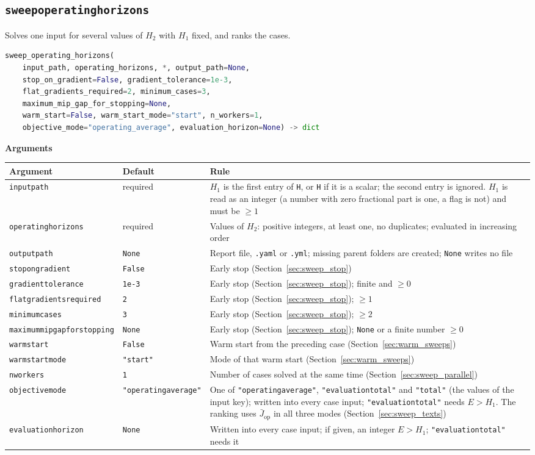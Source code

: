 \documentclass[11pt,a4paper]{article}
\makeatletter
\theoremstyle{plain}
\theoremstyle{definition}
\newcommand{\blockhead}[1]{\par\noindent\textbf{#1}\par\nobreak}
\renewcommand{\_}{\textunderscore\allowbreak{}}
\providecommand{\typerow}[3]{{\raggedright #1\par} & {\raggedright #2\par} & {\raggedright #3\par} \\}
\providecommand{\tabstart}[2]{\begingroup\small\begin{longtable}{@{}#1@{}}\toprule #2 \\ \midrule \endhead}
\providecommand{\tabend}{\bottomrule\end{longtable}\endgroup}
\makeatother
\begin{document}
\subsection{\texttt{sweep\_operating\_horizons}}
\label{sec:sweep_operating}

Solves one input for several values of $H_2$ with $H_1$ fixed, and ranks the cases.

\begin{lstlisting}[language=Python]
sweep_operating_horizons(
    input_path, operating_horizons, *, output_path=None,
    stop_on_gradient=False, gradient_tolerance=1e-3,
    flat_gradients_required=2, minimum_cases=3,
    maximum_mip_gap_for_stopping=None,
    warm_start=False, warm_start_mode="start", n_workers=1,
    objective_mode="operating_average", evaluation_horizon=None) -> dict
\end{lstlisting}

\blockhead{Arguments}
\tabstart{p{4.3cm}p{2.3cm}p{8.2cm}}{Argument & Default & Rule}
\typerow{\texttt{input\_path}}{required}{$H_1$ is the first entry of \texttt{H}, or \texttt{H} if it is a scalar; the second entry is ignored. $H_1$ is read as an integer (a number with zero fractional part is one, a flag is not) and must be $\ge 1$}
\typerow{\texttt{operating\_horizons}}{required}{Values of $H_2$: positive integers, at least one, no duplicates; evaluated in increasing order}
\typerow{\texttt{output\_path}}{\texttt{None}}{Report file, \texttt{.yaml} or \texttt{.yml}; missing parent folders are created; \texttt{None} writes no file}
\typerow{\texttt{stop\_on\_gradient}}{\texttt{False}}{Early stop (Section~\ref{sec:sweep_stop})}
\typerow{\texttt{gradient\_tolerance}}{\texttt{1e-3}}{Early stop (Section~\ref{sec:sweep_stop}); finite and $\ge 0$}
\typerow{\texttt{flat\_gradients\_required}}{\texttt{2}}{Early stop (Section~\ref{sec:sweep_stop}); $\ge 1$}
\typerow{\texttt{minimum\_cases}}{\texttt{3}}{Early stop (Section~\ref{sec:sweep_stop}); $\ge 2$}
\typerow{\texttt{maximum\_mip\_gap\_for\_stopping}}{\texttt{None}}{Early stop (Section~\ref{sec:sweep_stop}); \texttt{None} or a finite number $\ge 0$}
\typerow{\texttt{warm\_start}}{\texttt{False}}{Warm start from the preceding case (Section~\ref{sec:warm_sweeps})}
\typerow{\texttt{warm\_start\_mode}}{\texttt{"start"}}{Mode of that warm start (Section~\ref{sec:warm_sweeps})}
\typerow{\texttt{n\_workers}}{\texttt{1}}{Number of cases solved at the same time (Section~\ref{sec:sweep_parallel})}
\typerow{\texttt{objective\_mode}}{\texttt{"operating\_average"}}{One of \texttt{"operating\_average"}, \texttt{"evaluation\_total"} and \texttt{"total"} (the values of the input key); written into every case input; \texttt{"evaluation\_total"} needs $E > H_1$. The ranking uses $\bar J_{\mathrm{op}}$ in all three modes (Section~\ref{sec:sweep_texts})}
\typerow{\texttt{evaluation\_horizon}}{\texttt{None}}{Written into every case input; if given, an integer $E > H_1$; \texttt{"evaluation\_total"} needs it}
\tabend
\end{document}
